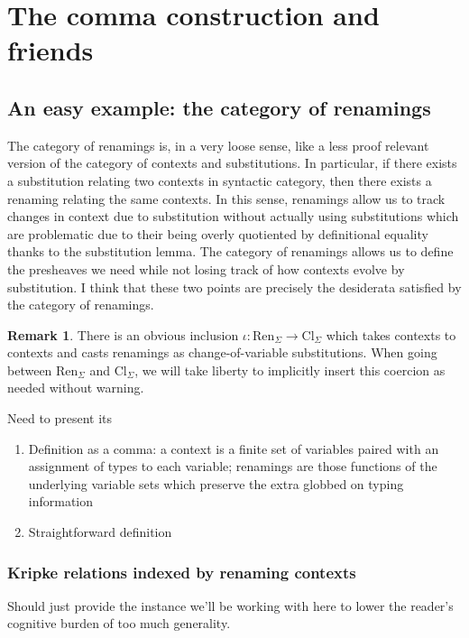 \documentclass[12pt,twoside]{reedthesis}
\theoremstyle{definition}
\newtheorem{remark}{Remark}
\theoremstyle{remark}
\theoremstyle{plain}
\newcommand{\cl}{\text{Cl}_\Sigma}
\newcommand{\ren}{\text{Ren}_\Sigma}
\begin{document}
\section{The comma construction and friends}

\subsection{An easy example: the category of renamings}
The category of renamings is, in a very loose sense, like a less proof relevant
version of the category of contexts and substitutions. In particular, if there
exists a substitution relating two contexts in syntactic category, then there
exists a renaming relating the same contexts. In this sense, renamings allow us
to track changes in context due to substitution without actually using
substitutions which are problematic due to their being overly quotiented by
definitional equality thanks to the substitution lemma. The category of
renamings allows us to define the presheaves we need while not losing track of
how contexts evolve by substitution. I think that these two points are precisely
the desiderata satisfied by the category of renamings.

\begin{remark}
  There is an obvious inclusion \( \iota : \ren \rightarrow \cl \) which takes contexts to
  contexts and casts renamings as change-of-variable substitutions. When going
  between \( \ren \) and \( \cl \), we will take liberty to implicitly insert
  this coercion as needed without warning.
\end{remark}

Need to present its
\begin{enumerate}
  \item Definition as a comma: a context is a finite set of variables paired
        with an assignment of types to each variable; renamings are those
        functions of the underlying variable sets which preserve the extra
        globbed on typing information
  \item Straightforward definition
\end{enumerate}

\subsubsection{Kripke relations indexed by renaming contexts}
Should just provide the instance we'll be working with here to lower the
reader's cognitive burden of too much generality.
\end{document}
